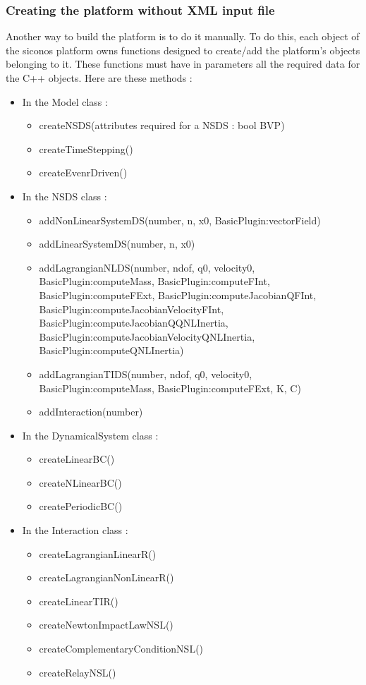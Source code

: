\subsubsection{Creating the platform without XML input file}
Another way to build the platform is to do it manually.
To do this, each object of the \ac{siconos} platform owns functions designed to create/add the
platform's objects belonging to it. These functions must have in parameters all the required data for
the C++ objects. Here are these methods :
\begin{itemize}
	\item In the Model class :
	\begin{itemize}
		\item createNSDS(attributes required for a NSDS : bool BVP)
		\item createTimeStepping()
		\item createEvenrDriven()
	\end{itemize}
	
	\item In the NSDS class :
	\begin{itemize}
		\item addNonLinearSystemDS(number, n, x0, BasicPlugin:vectorField)
		\item addLinearSystemDS(number, n, x0)
		\item addLagrangianNLDS(number, ndof, q0, velocity0, BasicPlugin:computeMass,
		BasicPlugin:computeFInt, BasicPlugin:computeFExt,
		BasicPlugin:computeJacobianQFInt, BasicPlugin:computeJacobianVelocityFInt,
		BasicPlugin:computeJacobianQQNLInertia,
		BasicPlugin:computeJacobianVelocityQNLInertia, BasicPlugin:computeQNLInertia)
		\item addLagrangianTIDS(number, ndof, q0, velocity0, BasicPlugin:computeMass, BasicPlugin:computeFExt, K, C)
		\item addInteraction(number)
	\end{itemize}
	
	\item In the DynamicalSystem class :
	\begin{itemize}
		\item createLinearBC()
		\item createNLinearBC()
		\item createPeriodicBC()
	\end{itemize}
	
	\item In the Interaction class :
	\begin{itemize}
		\item createLagrangianLinearR()
		\item createLagrangianNonLinearR()
		\item createLinearTIR()
		\item createNewtonImpactLawNSL()
		\item createComplementaryConditionNSL()
		\item createRelayNSL()
	\end{itemize}
	

\end{itemize}
